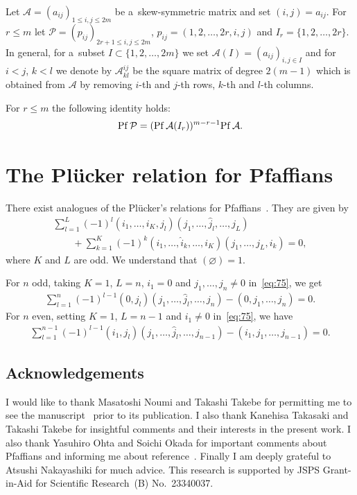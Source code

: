 \documentclass[pdftex]{sigma}
\begin{document}
  Let ${\mathcal A}=(a_{ij})_{1\le i,j\le2m}$ be a~skew-symmetric matrix and set $(i,j)=a_{ij}$.
For $r\le m$ let ${\mathcal P} =(p_{ij})_{2r+1\le i,j\le2m}$, $p_{ij}=(1,2,\dots,2r,i,j)$ and $I_r=\{1,2,\dots,2r\}$.
In general, for a~subset $I\subset\{1,2,\dots,2m\}$ we set ${\mathcal A}(I)=(a_{ij})_{i,j\in I}$ and for $i<j$, $k<l$
we denote by ${\mathcal A}_{kl}^{ij}$ be the square matrix of degree $2(m-1)$ which is obtained from ${\mathcal A}$ by
removing $i$-th and $j$-th rows, $k$-th and $l$-th columns.

\begin{theorem}[\cite{H2}]\label{theorem5} For $r\le m$ the following identity holds:
\begin{gather*}%
{\rm Pf}\,{\mathcal P}=({\rm Pf}\,{\mathcal A}(I_r))^{m-r-1}{\rm Pf}\,{\mathcal A}.
\end{gather*}
\end{theorem}

\section{The Pl\"{u}cker relation for Pfaf\/f\/ians}\label{appendixC}

 There exist analogues of the Pl\"{u}cker's
relations for Pfaf\/f\/ians~\cite{O1}.
They are given by
\begin{gather}
\sum_{l=1}^L(-1)^l(i_1,\dots,i_K,j_l)(j_1,\dots,\hat{j}_l,\dots,j_L)
\nonumber
\\
\qquad
{}+\sum_{k=1}
^K(-1)^k(i_1,\dots,\hat{i}_k,\dots,i_K)(j_1,\dots,j_L,i_k)=0,
\label{eq:75}
\end{gather}
where $K$ and $L$ are odd.
We understand that $(\varnothing)=1$.

For $n$ odd, taking $K=1$, $L=n$, $i_1=0$ and $j_1,\dots,j_n\neq0$ in~\eqref{eq:75}, we get
\begin{gather}
\sum_{l=1}^n(-1)^{l-1}(0,j_l)(j_1,\dots,\hat{j}_l,\dots,j_n)-(0,j_1,\dots,j_n)=0.
\label{eq:500}
\end{gather}
For $n$ even, setting $K=1$, $L=n-1$ and $i_1\neq0$ in~\eqref{eq:75}, we have
\begin{gather}
\sum_{l=1}^{n-1}(-1)^{l-1}(i_1,j_l)(j_1,\dots,\hat{j}_l,\dots,j_{n-1})-(i_1,j_1,\dots,j_{n-1})=0.
\label{eq:501}
\end{gather}

\subsection*{Acknowledgements} I would like to thank Masatoshi Noumi and Takashi Takebe for permitting me
to see the manuscript~\cite{NT1} prior to its publication.
I also thank Kanehisa Takasaki and Takashi Takebe for insightful comments and their interests in the
present work.
I also thank Yasuhiro Ohta and Soichi Okada for important comments about Pfaf\/f\/ians and informing me
about reference~\cite{H2}.
Finally I am deeply grateful to Atsushi Nakayashiki for much advice.
This research is supported by JSPS Grant-in-Aid for Scientif\/ic Research~(B) No.~23340037.
\end{document}
